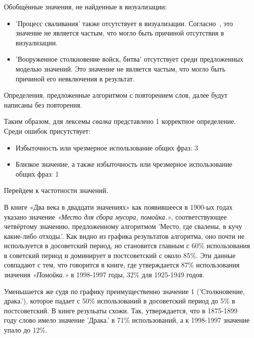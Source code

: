 Обобщённые значения, не найденные в визуализации:

\begin{itemize}
    \item ’Процесс сваливания’ также отсутствует в визуализации.
Согласно~\cite{TwoCenturies}, это значение не является частым, что могло быть причиной отсутствия в визуализации.

    \item ’Вооруженное столкновение войск, битва’ отсутствует среди предложенных моделью значений.
Это значение не является частым, что могло быть причиной его невключения в результат.
\end{itemize}

Определения, предложенные алгоритмом с повторением слов, далее будут написаны без повторения.

Таким образом, для лексемы \textit{свалка} представлено 1 корректное определение.
Среди ошибок присутствует:
\begin{itemize}
    \item Избыточность или чрезмерное использование общих фраз: 3
    \item Близкое значение, а также избыточность или чрезмерное использование общих фраз: 1
\end{itemize}

Перейдем к частотности значений.

В книге «Два века в двадцати значениях» как появившееся в 1900-ых годах указано
значение \textit{«Место для сбора мусора, помойка.»}, соответствующее четвёртому значению,
предложенному алгоритмом ’Место, где свалены, в кучу какие-либо отходы.’.
Как видно из графика результатов алгоритма, оно почти не используется в досоветский период,
но становится главным
с 60\% использования в советский период и доминирует в постсоветский с около 85\%.
Эти данные совпадают с тем, что говорится в книге, где утверждается 87\% использования
значения \textit{«Помойка.»} в 1998-1997 годы, 32\% для 1925-1949 годов.

Уменьшается же судя по графику преимущественно значение 1 (’Столкновение, драка.’),
которое падает с 50\% использований в досоветский период до 5\% в постсоветский.
В книге резульаты схожи.
Так, утверждается, что в 1875-1899 году слово имело значение ’Драка.’
в 71\% использований,
а к 1998-1997 значение упало до 12\%.

